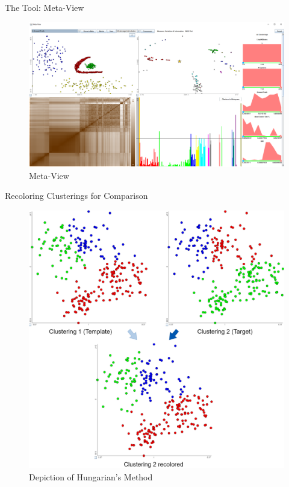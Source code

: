 \documentclass[aspectratio=169]{beamer}
\begin{document}
\begin{frame}{The Tool: Meta-View}
	
	\begin{figure}
	  \centering
	    \includegraphics[width=.9\textwidth]{meta-view}
	  \caption{Meta-View}
	  \label{fig:meta-view}
	\end{figure}

\end{frame}

\begin{frame}{Recoloring Clusterings for Comparison}
	
	\begin{figure}
	  \centering
	    \includegraphics[width=.51\textwidth]{my-hungarian}
	  \caption{Depiction of Hungarian's Method }
	  \label{fig:hungarian}
	\end{figure}

\end{frame}
\end{document}
